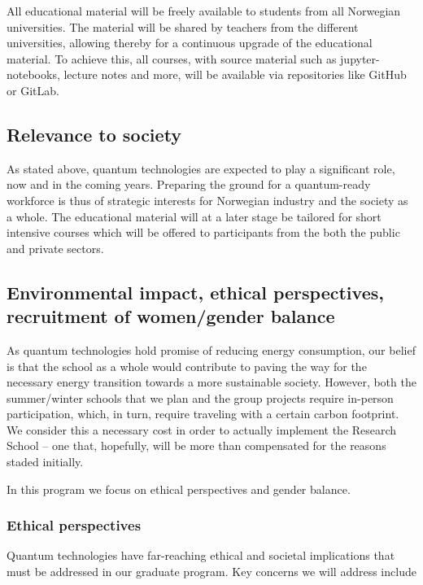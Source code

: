 \documentclass{scrreprt}
\begin{document}
All educational material will be freely available to students from all
Norwegian universities. The material will be shared by teachers from
the different universities, allowing thereby for a continuous upgrade
of the educational material.  To achieve this, all courses, with
source material such as jupyter-notebooks, lecture notes and more,
will be available via repositories like GitHub or GitLab.


\subsection{Relevance to society}
As stated above, quantum technologies are expected to play a significant role, now and in the coming years. Preparing the ground for a quantum-ready workforce is thus of strategic interests for Norwegian industry and the society as a whole. 
The educational material will at a later stage be tailored for short intensive courses which will be offered to participants from the both the public and private sectors. 

\subsection{Environmental impact, ethical perspectives, recruitment of women/gender balance }

As quantum technologies hold promise of reducing energy consumption, our belief is that the school as a whole would contribute to paving the way for the necessary energy transition towards a more sustainable society. However, both the summer/winter schools that we plan and the group projects require in-person participation, which, in turn, require traveling with a certain carbon footprint. We consider this a necessary cost in order to actually implement the Research School -- one that, hopefully, will be more than compensated for the reasons staded initially.

In this program we focus on ethical perspectives and gender balance.

\subsubsection{Ethical perspectives}
Quantum technologies have far-reaching ethical and societal implications that must be addressed in our  graduate program. Key concerns we will address include
\end{document}
